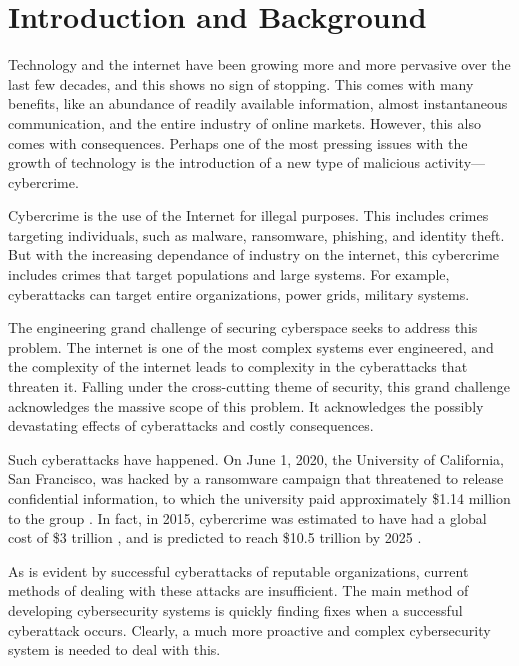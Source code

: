 \section{Introduction and Background}
Technology and the internet have been growing more and more pervasive over the last few decades, and this shows no sign of stopping.
This comes with many benefits, like an abundance of readily available information, almost instantaneous communication, and the entire industry of online markets.
However, this also comes with consequences.
Perhaps one of the most pressing issues with the growth of technology is the introduction of a new type of malicious activity---cybercrime.

Cybercrime is the use of the Internet for illegal purposes.
This includes crimes targeting individuals, such as malware, ransomware, phishing, and identity theft.
But with the increasing dependance of industry on the internet, this cybercrime includes crimes that target populations and large systems.
For example, cyberattacks can target entire organizations, power grids, military systems.

The engineering grand challenge of securing cyberspace seeks to address this problem.
The internet is one of the most complex systems ever engineered, and the complexity of the internet leads to complexity in the cyberattacks that threaten it.
Falling under the cross-cutting theme of security, this grand challenge acknowledges the massive scope of this problem.
It acknowledges the possibly devastating effects of cyberattacks and costly consequences.

Such cyberattacks have happened.
On June 1, 2020, the University of California, San Francisco, was hacked by a ransomware campaign that threatened to release confidential information, to which the university paid approximately \$1.14 million to the group \cite{winder2020}.
In fact, in 2015, cybercrime was estimated to have had a global cost of \$3 trillion \cite{microsoft2016}, and is predicted to reach \$10.5 trillion by 2025 \cite{morgan2020}.

As is evident by successful cyberattacks of reputable organizations, current methods of dealing with these attacks are insufficient.
The main method of developing cybersecurity systems is quickly finding fixes when a successful cyberattack occurs.
Clearly, a much more proactive and complex cybersecurity system is needed to deal with this.
